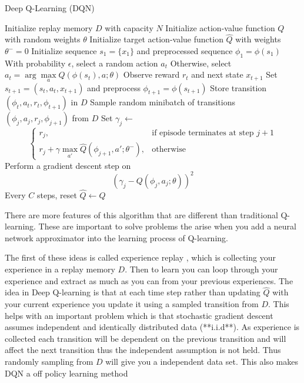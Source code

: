 \begin{algorithm}
\caption{Deep Q-Learning (DQN)}
\begin{algorithmic}[1]
\State Initialize replay memory $D$ with capacity $N$
\State Initialize action-value function $Q$ with random weights $\theta$
\State Initialize target action-value function $\hat{Q}$ with weights $\theta^{-} = 0$
    \State Initialize sequence $s_{1} = \{ x_{1} \}$ and preprocessed sequence $\phi_{1} = \phi(s_{1})$
        \State With probability $\epsilon$, select a random action $a_{t}$
        \State Otherwise, select $a_{t} = \arg\max\limits_{a} Q(\phi(s_{t}), a; \theta)$
        \State Observe reward $r_{t}$ and next state $x_{t+1}$
        \State Set $s_{t+1} = (s_{t}, a_{t}, x_{t+1})$ and preprocess $\phi_{t+1} = \phi(s_{t+1})$
        \State Store transition $(\phi_{t}, a_{t}, r_{t}, \phi_{t+1})$ in $D$
        \State Sample random minibatch of transitions $(\phi_{j}, a_{j}, r_{j}, \phi_{j+1})$ from $D$
        \State Set $\gamma_{j} \gets$
        \[
        \begin{cases} 
        r_j, & \text{if episode terminates at step } j+1 \\
        r_{j} + \gamma \max\limits_{a'} \hat{Q}(\phi_{j+1}, a'; \theta^{-}), & \text{otherwise}
        \end{cases}
        \]
        \State Perform a gradient descent step on 
        \[
        \left( \gamma_{j} - Q(\phi_{j}, a_{j}; \theta) \right)^{2}
        \]
        \State Every $C$ steps, reset $\hat{Q} \gets Q$
    \EndFor
\EndFor
\end{algorithmic}
\end{algorithm}

There are more features of this algorithm that are different than traditional Q-learning. These are important to solve problems the arise when you add a neural network approximator into the learning process of Q-learning.

The first of these ideas is called experience replay \cite{10.5555/168871}, which is collecting your experience in a replay memory $D$. Then to learn you can loop through your experience and extract as much as you can from your previous experiences. The idea in Deep Q-learning is that at each time step rather than updating $\hat{Q}$ with your current experience you update it using a sampled transition from $D$. This helps with an important problem which is that stochastic gradient descent assumes independent and identically distributed data (**i.i.d**). As experience is collected each transition will be dependent on the previous transition and will affect the next transition thus the independent assumption is not held. Thus randomly sampling from $D$ will give you a independent data set. This also makes DQN a off policy learning method

